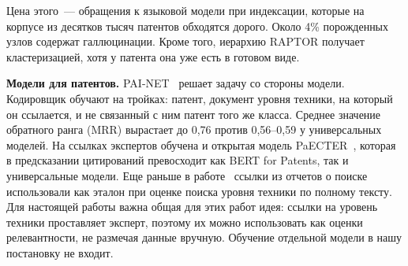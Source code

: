 \documentclass{article}
\begin{document}
Цена этого~--- обращения к языковой модели при индексации, которые на корпусе из десятков тысяч патентов обходятся дорого. Около 4\% порожденных узлов содержат галлюцинации. Кроме того, иерархию RAPTOR получает кластеризацией, хотя у патента она уже есть в готовом виде.

\textbf{Модели для патентов.}
PAI-NET~\citep{lee2025painet} решает задачу со стороны модели. Кодировщик обучают на тройках: патент, документ уровня техники, на который он ссылается, и не связанный с ним патент того же класса. Среднее значение обратного ранга (MRR) вырастает до 0,76 против 0,56--0,59 у универсальных моделей. На ссылках экспертов обучена и открытая модель PaECTER~\citep{ghosh2024paecter}, которая в предсказании цитирований превосходит как BERT for Patents, так и универсальные модели. Еще раньше в работе~\citep{helmers2019prior} ссылки из отчетов о поиске использовали как эталон при оценке поиска уровня техники по полному тексту. Для настоящей работы важна общая для этих работ идея: ссылки на уровень техники проставляет эксперт, поэтому их можно использовать как оценки релевантности, не размечая данные вручную. Обучение отдельной модели в нашу постановку не входит.
\end{document}
